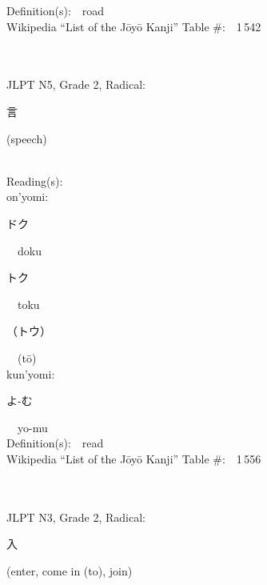\begin{multicols}{2}
Definition(s):\ \ road \\
Wikipedia ``List of the J\=oy\=o Kanji'' Table \#:\ \ 1\,542 \\
\ \ \\
{\fontsize{34pt}{40pt}  }\ \ \\  %
{JLPT N5, Grade 2, Radical:\ \ {\begin{CJK}{UTF8}{min} 言 \end{CJK}} (speech) } \\
Reading(s):\ \ \\
{\hspace*{1em}}on'yomi:\ \ \\
{\hspace*{2em}}{\begin{CJK}{UTF8}{min} ドク \end{CJK}}\ \ doku\ \ \\
{\hspace*{2em}}{\begin{CJK}{UTF8}{min} トク \end{CJK}}\ \ toku\ \ \\
{\hspace*{2em}}{\begin{CJK}{UTF8}{min} （トウ） \end{CJK}}\ \ (t\=o)\ \ \\
{\hspace*{1em}}kun'yomi:\ \ \\
{\hspace*{2em}}{\begin{CJK}{UTF8}{min} よ-む \end{CJK}}\ \ yo-mu\ \ \\
Definition(s):\ \ read \\
Wikipedia ``List of the J\=oy\=o Kanji'' Table \#:\ \ 1\,556 \\
\ \ \\
{\fontsize{34pt}{40pt}  }\ \ \\  %
{JLPT N3, Grade 2, Radical:\ \ {\begin{CJK}{UTF8}{min} 入 \end{CJK}} (enter, come in (to), join) } \\

\end{multicols}
